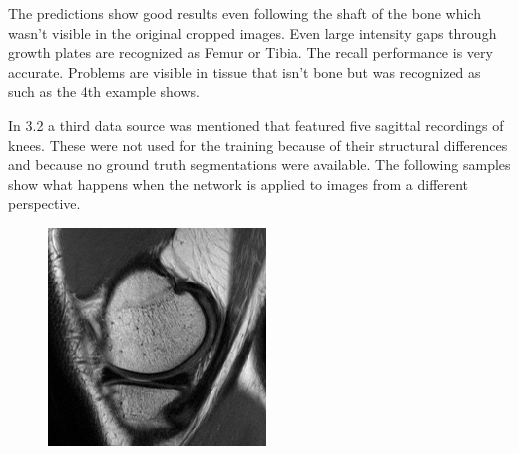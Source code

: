 The predictions show good results even following the shaft of the bone which wasn't visible in the original cropped images. Even large intensity gaps through growth plates are recognized as Femur or Tibia. The recall performance is very accurate. Problems are visible in tissue that isn't bone but was recognized as such as the 4th example shows.

In 3.2 a third data source was mentioned that featured five sagittal recordings of knees. These were not used for the training because of their structural differences and because no ground truth segmentations were available. The following samples show what happens when the network is applied to images from a different perspective.

\begin{figure}[H]
  \includegraphics[width=\linewidth]{imgs/transfer_pers_x1.png}
\endminipage\hfill
{}

\end{figure}
